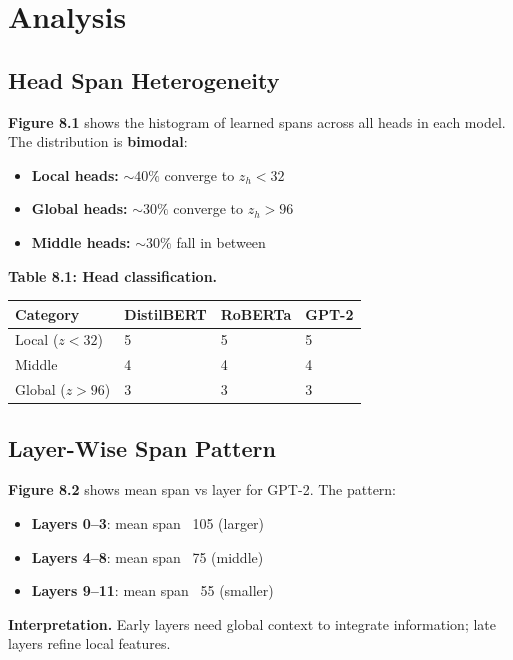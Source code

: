 
\section{Analysis}

\subsection{Head Span Heterogeneity}

\textbf{Figure 8.1} shows the histogram of learned spans across all heads in each 
model. The distribution is \textbf{bimodal}:

\begin{itemize}
\item \textbf{Local heads:} $\sim 40\%$ converge to $z_h < 32$
\item \textbf{Global heads:} $\sim 30\%$ converge to $z_h > 96$
\item \textbf{Middle heads:} $\sim 30\%$ fall in between

\end{itemize}
\textbf{Table 8.1: Head classification.}

\begin{table}[H]
\centering
\small
\begin{tabular}{llll}
\toprule
\textbf{Category} & \textbf{DistilBERT} & \textbf{RoBERTa} & \textbf{GPT-2} \\
\midrule
Local ($z < 32$) & 5 & 5 & 5 \\
Middle & 4 & 4 & 4 \\
Global ($z > 96$) & 3 & 3 & 3 \\
\bottomrule
\end{tabular}
\end{table}

\subsection{Layer-Wise Span Pattern}

\textbf{Figure 8.2} shows mean span vs layer for GPT-2. The pattern:

\begin{itemize}
\item \textbf{Layers 0--3}: mean span ~105 (larger)
\item \textbf{Layers 4--8}: mean span ~75 (middle)
\item \textbf{Layers 9--11}: mean span ~55 (smaller)

\end{itemize}
\textbf{Interpretation.} Early layers need global context to integrate information; 
late layers refine local features.

